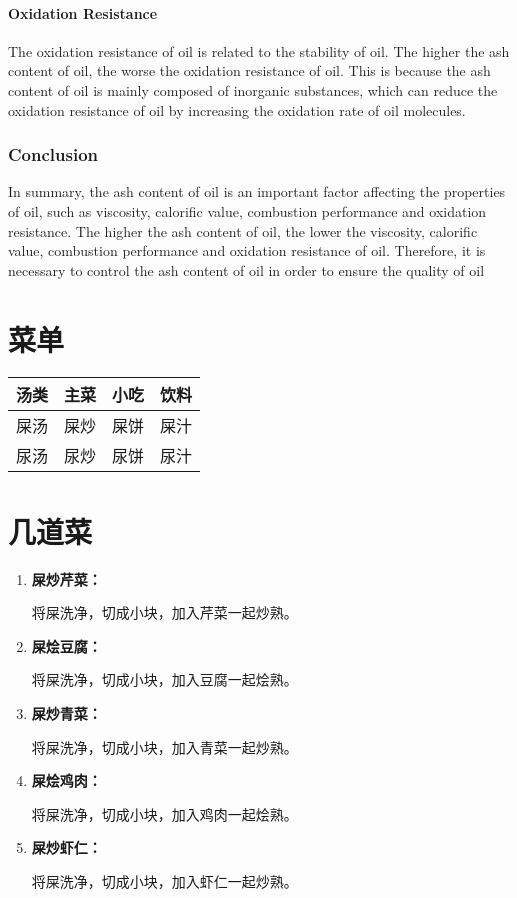 \documentclass[titlepage,oneside]{ctexbook}
\begin{document}
\subsubsection*{Oxidation Resistance}

The oxidation resistance of oil is related to the stability of oil. The higher the ash content of oil, the worse the oxidation resistance of oil. This is because the ash content of oil is mainly composed of inorganic substances, which can reduce the oxidation resistance of oil by increasing the oxidation rate of oil molecules.

\subsection*{Conclusion}

In summary, the ash content of oil is an important factor affecting the properties of oil, such as viscosity, calorific value, combustion performance and oxidation resistance. The higher the ash content of oil, the lower the viscosity, calorific value, combustion performance and oxidation resistance of oil. Therefore, it is necessary to control the ash content of oil in order to ensure the quality of oil

\chapter{菜单}
\begin{center}
    \begin{tabular}[pos]{cccc}
        \toprule
        \textbf{汤类} & \textbf{主菜} & \textbf{小吃} & \textbf{饮料}\\
        \midrule
        屎汤 & 屎炒 & 屎饼 & 屎汁 \\
        尿汤 & 尿炒 & 尿饼 & 尿汁 \\
        \bottomrule
    \end{tabular}

\end{center}

\chapter{几道菜}
\begin{enumerate}
    \item \textbf{屎炒芹菜：}
    
    将屎洗净，切成小块，加入芹菜一起炒熟。
    \item \textbf{屎烩豆腐：}
    
    将屎洗净，切成小块，加入豆腐一起烩熟。
    \item \textbf{屎炒青菜：}
    
    将屎洗净，切成小块，加入青菜一起炒熟。
    \item \textbf{屎烩鸡肉：}
    
    将屎洗净，切成小块，加入鸡肉一起烩熟。
    \item \textbf{屎炒虾仁：}
    
    将屎洗净，切成小块，加入虾仁一起炒熟。
\end{enumerate}
\end{document}
